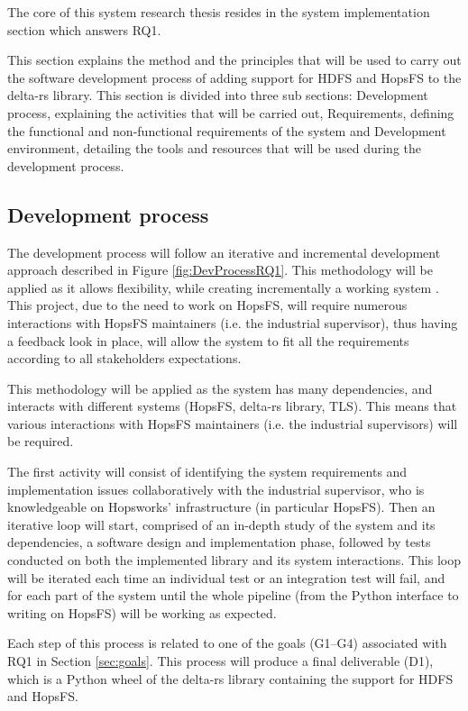 The core of this system research thesis resides in the system implementation section which answers RQ1.

This section explains the method and the principles that will be used to carry out the software development process of adding support for \gls{HDFS} and \gls{HopsFS} to the delta-rs library. This section is divided into three sub sections: Development process, explaining the activities that will be carried out, Requirements, defining the functional and non-functional requirements of the system and Development environment, detailing the tools and resources that will be used during the development process.

\subsection{Development process}
The development process will follow an iterative and incremental development approach described in Figure \ref{fig:DevProcessRQ1}. This methodology will be applied as it allows flexibility, while creating incrementally a working system \cite{}. This project, due to the need to work on \gls{HopsFS}, will require numerous interactions with \gls{HopsFS} maintainers (i.e. the industrial supervisor), thus having a feedback look in place, will allow the system to fit all the requirements according to all stakeholders expectations.




This methodology will be applied as the system has many dependencies, and interacts with different systems (\gls{HopsFS}, delta-rs library, \gls{TLS}). This means that various interactions with \gls{HopsFS} maintainers (i.e. the industrial supervisors) will be required. 

The first activity will consist of identifying the system requirements and implementation issues collaboratively with the industrial supervisor, who is knowledgeable on Hopsworks' infrastructure (in particular \gls{HopsFS}). Then an iterative loop will start, comprised of an in-depth study of the system and its dependencies, a software design and implementation phase, followed by tests conducted on both the implemented library and its system interactions. This loop will be iterated each time an individual test or an integration test will fail, and for each part of the system until the whole pipeline (from the Python interface to writing on \gls{HopsFS}) will be working as expected. 

Each step of this process is related to one of the goals (G1--G4) associated with RQ1 in Section \ref{sec:goals}. This process will produce a final deliverable (D1), which is a Python wheel of the delta-rs library containing the support for \gls{HDFS} and \gls{HopsFS}.

